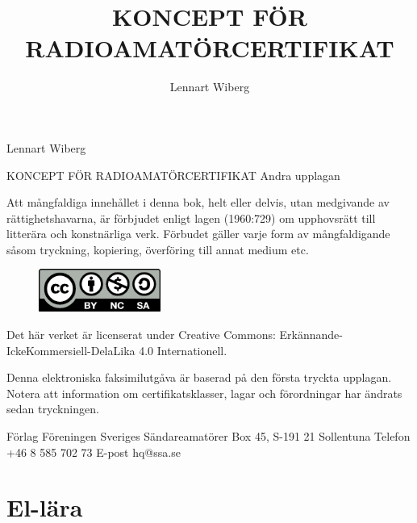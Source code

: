 \documentclass[a4paper,twoside,twocolumn,openright]{book}
\begin{document}
\frontmatter
\title{KONCEPT FÖR RADIOAMATÖRCERTIFIKAT}
\author{Lennart Wiberg}
\maketitle

Lennart Wiberg

KONCEPT FÖR RADIOAMATÖRCERTIFIKAT
Andra upplagan

Att mångfaldiga innehållet i denna bok, helt eller delvis, utan medgivande av
rättighetshavarna, är förbjudet enligt lagen (1960:729) om upphovsrätt till
litterära och konstnärliga verk. Förbudet gäller varje form av mångfaldigande
såsom tryckning, kopiering, överföring till annat medium etc.

\begin{figure}[h]
\includegraphics[width=4cm]{images/cc-by-nc-sa}
\end{figure}
Det här verket är licenserat under Creative Commons: Erkännande-IckeKommersiell-DelaLika 4.0 Internationell.



Denna elektroniska faksimilutgåva är baserad på den första tryckta
upplagan. Notera att information om certifikatsklasser, lagar och
förordningar har ändrats sedan tryckningen.


Förlag
Föreningen Sveriges Sändareamatörer
Box 45, S-191 21 Sollentuna
Telefon +46 8 585 702 73
E-post hq@ssa.se


\tableofcontents

\mainmatter










\chapter{El-lära}


\cleardoublepage

\cleardoublepage

\cleardoublepage

\cleardoublepage

\cleardoublepage

\cleardoublepage

\cleardoublepage

\cleardoublepage

\end{document}
